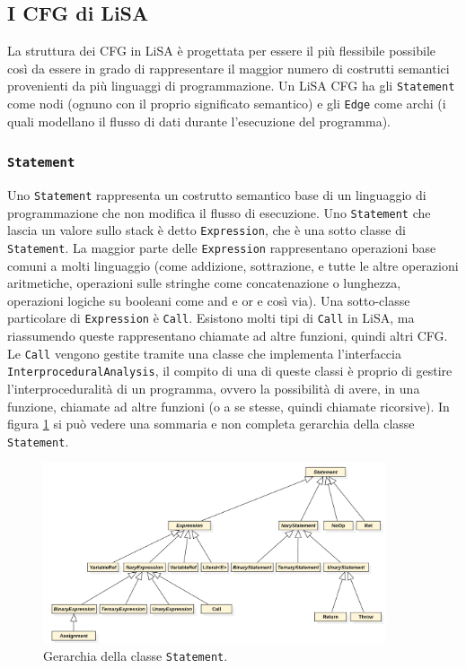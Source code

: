 \subsection{I CFG di LiSA}
La struttura dei CFG in LiSA è progettata per essere il più flessibile possibile così da essere in grado di rappresentare il maggior numero di costrutti semantici provenienti da più linguaggi di programmazione. Un LiSA CFG ha gli \texttt{Statement} come nodi (ognuno con il proprio significato semantico) e gli \texttt{Edge} come archi (i quali modellano il flusso di dati durante l'esecuzione del programma). 

\subsubsection{\texttt{Statement}}
Uno \texttt{Statement} rappresenta un costrutto semantico base di un linguaggio di programmazione che non modifica il flusso di esecuzione. Uno \texttt{Statement} che lascia un valore sullo stack è detto \texttt{Expression}, che è una sotto classe di \texttt{Statement}. La maggior parte delle \texttt{Expression} rappresentano operazioni base comuni a molti linguaggio (come addizione, sottrazione, e tutte le altre operazioni aritmetiche, operazioni sulle stringhe come concatenazione o lunghezza, operazioni logiche su booleani come and e or e così via). Una sotto-classe particolare di \texttt{Expression} è \texttt{Call}. Esistono molti tipi di \texttt{Call} in LiSA, ma riassumendo queste rappresentano chiamate ad altre funzioni, quindi altri CFG. Le \texttt{Call} vengono gestite tramite una classe che implementa l'interfaccia \texttt{InterproceduralAnalysis}, il compito di una di queste classi è proprio di gestire l'interproceduralità di un programma, ovvero la possibilità di avere, in una funzione, chiamate ad altre funzioni (o a se stesse, quindi chiamate ricorsive). In figura \ref{fig:gerarchiaStatement} si può vedere una sommaria e non completa gerarchia della classe \texttt{Statement}.

\begin{figure}[ht]
	\centering
	\includegraphics[width=0.9\textwidth]{Immagini/gerarchiaStatement.png}
	\caption{Gerarchia della classe \texttt{Statement}.}
	\label{fig:gerarchiaStatement}
\end{figure}

